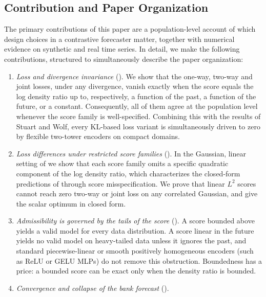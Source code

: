 \documentclass[11pt]{article}
\theoremstyle{plain}
\theoremstyle{definition}
\theoremstyle{remark}
\begin{document}
\subsection{Contribution and Paper Organization}
\label{ssec:CAO}

The primary contributions of this paper are a population-level account of
which design choices in a contrastive forecaster matter, together with
numerical evidence on synthetic and real time series. In detail, we make the
following contributions, structured to simultaneously describe the paper
organization:
\begin{enumerate}[start=1,label={(C\arabic*)}]
 \item \emph{Loss and divergence invariance} ().
       We show that the one-way, two-way and joint losses, under any
       divergence, vanish exactly when the score equals the log density ratio
       up to, respectively, a function of the past, a function of the future,
       or a constant. Consequently, all of them agree at the population level
       whenever the score family is well-specified. Combining this with the
       results of Stuart and Wolf, every KL-based loss variant is
       simultaneously driven to zero by flexible two-tower encoders on
       compact domains.
 \item \emph{Loss differences under restricted score families} ().
       In the Gaussian, linear setting of \cite{baptista2025mathematical} we
       show that each score family omits a specific quadratic component of the
       log density ratio, which characterizes the closed-form predictions of
       \cite{baptista2025mathematical} through score misspecification. We
       prove that linear $L^2$ scores cannot reach zero two-way or joint loss
       on any correlated Gaussian, and give the scalar optimum in closed form.
 \item \emph{Admissibility is governed by the tails of the score}
       ().
       A score bounded above yields a valid model for every data
       distribution. A score linear in the future yields no valid model on
       heavy-tailed data unless it ignores the past, and standard piecewise-linear
       or smooth positively homogeneous encoders (such as ReLU or GELU MLPs) do not
       remove this obstruction. Boundedness has a price: a bounded score can
       be exact only when the density ratio is bounded.
 \item \emph{Convergence and collapse of the bank forecast}
       ().

\end{enumerate}
\end{document}

